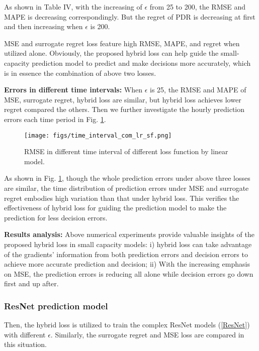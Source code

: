 \documentclass[journal]{IEEEtran}
\begin{document}
As shown in Table IV, with the increasing of $\epsilon$ from 25 to 200, the RMSE and MAPE is decreasing correspondingly. But the regret of PDR is decreasing at first and then increasing when $\epsilon$ is 200. 

MSE and surrogate regret loss feature high RMSE, MAPE, and regret when utilized alone. Obviously, the proposed hybrid loss can help guide the small-capacity prediction model to predict and make decisions more accurately, which is in essence the combination of above two losses.

\textbf{Errors in different time intervals:} 
When $\epsilon$ is 25, the RMSE and MAPE of MSE, surrogate regret, hybrid loss are similar, but hybrid loss achieves lower regret compared the others. Then we further investigate the hourly prediction errors each time period in Fig. \ref{interval_comparison_linear}. 

\begin{figure}[ht]
  \centering
  \texttt{[image: figs/time\_interval\_com\_lr\_sf.png]}
  \caption{RMSE in different time interval of different loss function by linear model.}
  \label{interval_comparison_linear}
\end{figure}

As shown in Fig. \ref{interval_comparison_linear}, though the whole prediction errors under above three losses are similar, the time distribution of prediction errors under MSE and surrogate regret embodies high variation than that under hybrid loss.  This verifies the effectiveness of hybrid loss for guiding the prediction model to make the prediction for less decision errors.

\textbf{Results analysis:} 
Above numerical experiments provide valuable insights of the proposed hybrid loss in small capacity models: i) hybrid loss can take advantage of the gradients' information from both prediction errors and decision errors to achieve more accurate prediction and decision; ii) With the increasing emphasis on MSE, the prediction errors is reducing all alone while decision errors go down first and up after.

\subsubsection{ResNet prediction model}
Then, the hybrid loss is utilized to train the complex ResNet models (\ref{ResNet}) with different $\epsilon$. Similarly, the surrogate regret and MSE loss are compared in this situation. 
\end{document}
